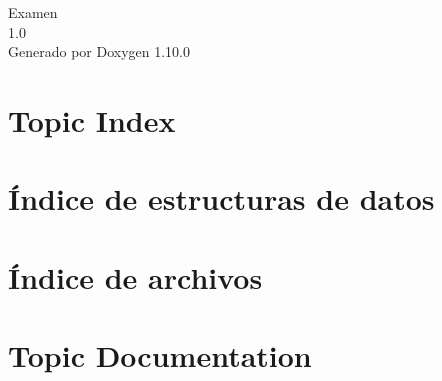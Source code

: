 \documentclass[twoside]{book}
\newcommand{\+}{\discretionary{\mbox{\scriptsize$\hookleftarrow$}}{}{}}
\newcommand{\clearemptydoublepage}{%
    \newpage{\pagestyle{empty}\cleardoublepage}%
  }
\begin{document}
  \raggedbottom
    \hypersetup{pageanchor=false,
                bookmarksnumbered=true,
                pdfencoding=unicode
               }
  \begin{titlepage}
  \vspace*{7cm}
  \begin{center}%
  {\Large Examen}\\
  [1ex]\large 1.\+0 \\
  \vspace*{1cm}
  {\large Generado por Doxygen 1.10.0}\\
  \end{center}
  \end{titlepage}
  \clearemptydoublepage
  \tableofcontents
  \clearemptydoublepage
  \hypersetup{pageanchor=true}


\chapter{Topic Index}

\chapter{Índice de estructuras de datos}

\chapter{Índice de archivos}

\chapter{Topic Documentation}

\end{document}

